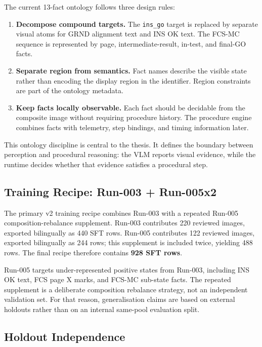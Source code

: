 The current 13-fact ontology follows three design rules:

\begin{enumerate}
\item \textbf{Decompose compound targets.} The \texttt{ins\_go} target is
replaced by separate visual atoms for GRND alignment text and INS OK text. The
FCS-MC sequence is represented by page, intermediate-result, in-test, and
final-GO facts.

\item \textbf{Separate region from semantics.} Fact names describe the visible
state rather than encoding the display region in the identifier. Region
constraints are part of the ontology metadata.

\item \textbf{Keep facts locally observable.} Each fact should be decidable from
the composite image without requiring procedure history. The procedure engine
combines facts with telemetry, step bindings, and timing information later.
\end{enumerate}

This ontology discipline is central to the thesis. It defines the boundary
between perception and procedural reasoning: the VLM reports visual evidence,
while the runtime decides whether that evidence satisfies a procedural step.

\subsection{Training Recipe: Run-003 + Run-005x2}

The primary v2 training recipe combines Run-003 with a repeated Run-005
composition-rebalance supplement. Run-003 contributes 220 reviewed images,
exported bilingually as 440 SFT rows. Run-005 contributes 122 reviewed images,
exported bilingually as 244 rows; this supplement is included twice, yielding
488 rows. The final recipe therefore contains \textbf{928 SFT rows}.

Run-005 targets under-represented positive states from Run-003, including INS
OK text, FCS page X marks, and FCS-MC sub-state facts. The repeated supplement
is a deliberate composition rebalance strategy, not an independent validation
set. For that reason, generalisation claims are based on external holdouts
rather than on an internal same-pool evaluation split.

\subsection{Holdout Independence}

